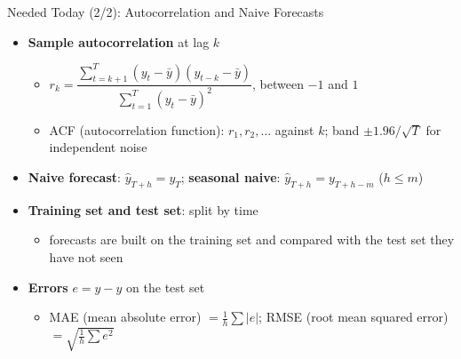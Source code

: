 \begin{frame}{Needed Today (2/2): Autocorrelation and Naive Forecasts}
\itemsize{\footnotesize}
\begin{itemize}
    \item \textbf{Sample autocorrelation} at lag $k$
    \begin{itemize}
        \item $r_k = \dfrac{\sum_{t=k+1}^{T} (y_t - \bar y)(y_{t-k} - \bar y)}{\sum_{t=1}^{T} (y_t - \bar y)^2}$, between $-1$ and $1$
        \item ACF (autocorrelation function): $r_1, r_2, \ldots$ against $k$; band $\pm 1.96/\sqrt T$ for independent noise
    \end{itemize}
    \item \textbf{Naive forecast}: $\hat y_{T+h} = y_T$; \textbf{seasonal naive}: $\hat y_{T+h} = y_{T+h-m}$ ($h \le m$)
    \item \textbf{Training set and test set}: split by time
    \begin{itemize}
        \item forecasts are built on the training set and compared with the test set they have not seen
    \end{itemize}
    \item \textbf{Errors} $e = y - \hat y$ on the test set
    \begin{itemize}
        \item MAE (mean absolute error) $= \frac1h \sum |e|$; RMSE (root mean squared error) $= \sqrt{\frac1h \sum e^2}$
    \end{itemize}
\end{itemize}
\end{frame}

